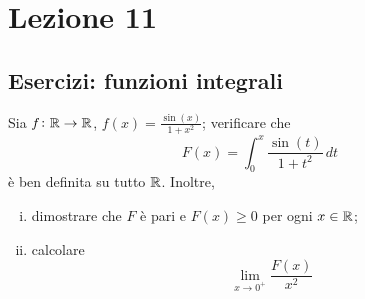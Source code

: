 \section{Lezione 11}
\subsection{Esercizi: funzioni integrali}
\begin{exercise}
    \label{ex:9.1}
    Sia $f\colon\amsbb{R}\to \amsbb{R}$, $f(x) = \frac{\sin(x)}{1+x^2}$; verificare che
    \[
    F(x) = \int_0^x \frac{\sin(t)}{1+t^2}\, dt
    \]
    è ben definita su tutto $\amsbb{R}$. Inoltre,
    \begin{enumerate}[(i)]
        \item dimostrare che $F$ è pari e $F(x)\ge 0$ per ogni $x\in\amsbb{R}$;
        \item calcolare 
        \[
        \lim_{x\to 0^+} \frac{F(x)}{x^2}
        \]
    \end{enumerate}
\end{exercise}
